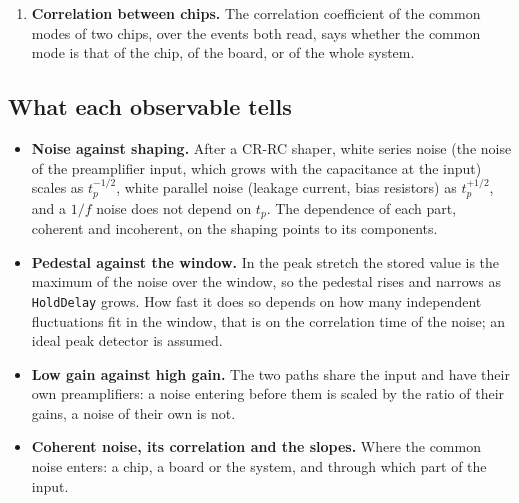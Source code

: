 \documentclass[11pt,a4paper]{article}
\begin{document}
\begin{enumerate}
  channels; the incoherent noise, $\sigma_\mathrm{inc}$, is the median of the $\sigma'_i$
  multiplied by $\sqrt{32/31}$; and the coherent noise follows from the variance of the common
  mode over the events,
  \begin{equation*}
  \sigma_\mathrm{coh}^2 = \mathrm{var}(\mathrm{CM}) - \sigma_\mathrm{inc}^2/32 .
  \end{equation*}
  The two corrections come from the mean itself: subtracting it removes from each channel 1/32
  of its own noise, and it keeps $1/\sqrt{32}$ of the incoherent noise of the channels, which
  is not common. The check is $\sigma_\mathrm{tot}^2 = \sigma_\mathrm{coh}^2 +
  \sigma_\mathrm{inc}^2$.
\item \textbf{Correlation between chips.} The correlation coefficient of the common modes of
  two chips, over the events both read, says whether the common mode is that of the chip, of
  the board, or of the whole system.
\end{enumerate}

\subsection{What each observable tells}
\label{sec:observables}

\begin{itemize}
\item \textbf{Noise against shaping.} After a CR-RC shaper, white series noise (the noise of
  the preamplifier input, which grows with the capacitance at the input) scales as
  $t_p^{-1/2}$, white parallel noise (leakage current, bias resistors) as $t_p^{+1/2}$, and a
  $1/f$ noise does not depend on $t_p$. The dependence of each part, coherent and incoherent,
  on the shaping points to its components.
\item \textbf{Pedestal against the window.} In the peak stretch the stored value is the maximum
  of the noise over the window, so the pedestal rises and narrows as \texttt{HoldDelay} grows.
  How fast it does so depends on how many independent fluctuations fit in the window, that is
  on the correlation time of the noise; an ideal peak detector is assumed.
\item \textbf{Low gain against high gain.} The two paths share the input and have their own
  preamplifiers: a noise entering before them is scaled by the ratio of their gains, a noise
  of their own is not.
\item \textbf{Coherent noise, its correlation and the slopes.} Where the common noise enters:
  a chip, a board or the system, and through which part of the input.
\end{itemize}
\end{document}
